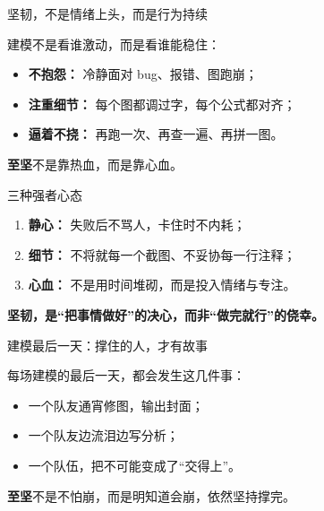 \begin{frame}{\color{deepnavy}坚韧，不是情绪上头，而是行为持续}
\justifying
{\color{darkcharcoal}
建模不是看谁激动，而是看谁能稳住：

\vspace{0.8em}
\begin{itemize}
  \item \textbf{不抱怨：} 冷静面对 bug、报错、图跑崩；
  \item \textbf{注重细节：} 每个图都调过字，每个公式都对齐；
  \item \textbf{逼着不挠：} 再跑一次、再查一遍、再拼一图。
\end{itemize}

\vspace{0.5em}
\textbf{\color{emphasisred}至坚}不是靠热血，而是靠心血。
}
\end{frame}

\begin{frame}{\color{deepnavy}三种强者心态}
\justifying
{\color{darkcharcoal}
\begin{enumerate}
  \item \textbf{静心：} 失败后不骂人，卡住时不内耗；
  \item \textbf{细节：} 不将就每一个截图、不妥协每一行注释；
  \item \textbf{心血：} 不是用时间堆砌，而是投入情绪与专注。
\end{enumerate}

\vspace{0.5em}
\textbf{坚韧，是“把事情做好”的决心，而非“做完就行”的侥幸。}
}
\end{frame}

\begin{frame}{\color{deepnavy}建模最后一天：撑住的人，才有故事}
\justifying
{\color{darkcharcoal}
每场建模的最后一天，都会发生这几件事：

\vspace{0.5em}
\begin{itemize}
  \item 一个队友通宵修图，输出封面；
  \item 一个队友边流泪边写分析；
  \item 一个队伍，把不可能变成了“交得上”。
\end{itemize}

\vspace{0.5em}
\textbf{\color{emphasisred}至坚}不是不怕崩，而是明知道会崩，依然坚持撑完。
}
\end{frame}

